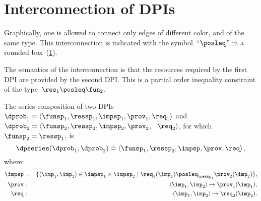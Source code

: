 \section{Interconnection of DPIs}


Graphically, one is allowed to connect only edges of different
color, and of the same type. This interconnection is indicated with the symbol~``$\posleq$''
in a rounded box~(\cref{fig:connection}).

\begin{figure}[h]
  \centering
{}
  \caption{\label{fig:connection}}
\end{figure}


\noindent The semantics of the interconnection is that the resources
required by the first DPI are provided by the second DPI. This is
a partial order inequality constraint of the type~$\res_{1}\posleq\fun_{2}$.


\begin{definition}
    \label{def:series-composition}The series composition of two DPIs
~$\dprob_{1}=\langle\funsp_{1},\ressp_{1},\impsp_{1},\prov_{1},\req_{1}\rangle$
    and~$\dprob_{2}=\langle\funsp_{2},\ressp_{2},\impsp_{2},\prov_{2}$,
~$\req_{2}\rangle$, for which~$\funsp_{2}=\ressp_{1}$, is
    \begin{equation}
        \dpseries(\dprob_{1},\dprob_{2})\doteq\left\langle \funsp_{1},\ressp_{2},\impsp,\prov,\req\right\rangle ,
    \end{equation}
    where:
    \begin{eqnarray}
        \impsp & = & \{\left\langle \imp_{1},\imp_{2}\right\rangle \in\impsp_{1}\times\impsp_{2}\mid\req_{1}(\imp_{1})\posleq_{\ressp_{1}}\prov_{2}(\imp_{2})\},\\
        \prov & : & \left\langle \imp_{1},\imp_{2}\right\rangle \mapsto\prov_{1}(\imp_{1}),\\
        \req & : & \left\langle \imp_{1},\imp_{2}\right\rangle \mapsto\req_{2}(\imp_{2}).
    \end{eqnarray}
\end{definition}






